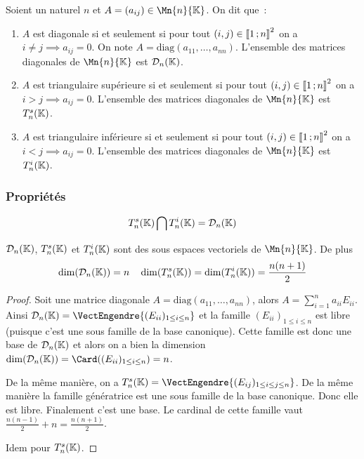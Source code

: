 Soient un naturel $n$ et $A=(a_{ij}) \in \Mn{n}{\K}$. On dit que~:
\begin{enumerate}
\item $A$ est diagonale si et seulement si pour tout $(i,j) \in \mathopen{\llbracket}1\mathclose{}\mathpunct{};n\mathclose{\rrbracket} ^2$ on a $i \neq j \implies a_{ij}=0$. On note $A=\text{diag}(a_{11},\ldots,a_{nn})$. L'ensemble des matrices diagonales de $\Mn{n}{\K}$ est $\mathcal{D}_n(\mathbb{K})$.
\item $A$ est triangulaire supérieure si et seulement si  pour tout $(i,j) \in \mathopen{\llbracket}1\mathclose{}\mathpunct{};n\mathclose{\rrbracket} ^2$ on a $i > j \implies a_{ij}=0$. L'ensemble des matrices diagonales de $\Mn{n}{\K}$ est $T_n^s(\mathbb{K})$.
\item $A$ est triangulaire inférieure si et seulement si  pour tout $(i,j) \in \mathopen{\llbracket}1\mathclose{}\mathpunct{};n\mathclose{\rrbracket} ^2$ on a $i < j \implies a_{ij}=0$. L'ensemble des matrices diagonales de $\Mn{n}{\K}$ est $T_n^i(\mathbb{K})$.
\end{enumerate}

\subsubsection{Propriétés}

\begin{prop}
  \begin{equation}
    T_n^s(\mathbb{K}) \bigcap T_n^i(\mathbb{K}) = \mathcal{D}_n(\mathbb{K})
  \end{equation}
\end{prop}
\begin{prop}
  $\mathcal{D}_n(\mathbb{K})$, $T_n^s(\mathbb{K})$ et $T_n^i(\mathbb{K})$ sont des sous espaces vectoriels de $\Mn{n}{\K}$. De plus
  \begin{equation}
    \dim(\mathcal{D}_n(\mathbb{K})) = n \quad \dim(T_n^s(\mathbb{K}))=\dim(T_n^i(\mathbb{K}))=\frac{n(n+1)}{2}
  \end{equation}
\end{prop}
\begin{proof}
  Soit une matrice diagonale $A=\text{diag}(a_{11},\ldots,a_{nn})$, alors $A=\sum_{i=1}^n a_{ii}E_{ii}$. Ainsi $\Dr_n(\K)=\VectEngendre{(E_{ii})_{1\leq i\leq n}}$ et la famille $(E_{ii})_{1\leq i\leq n}$ est libre (puisque c'est une sous famille de la base canonique). Cette famille est donc une base de $\mathcal{D}_n(\mathbb{K})$ et alors on a bien la dimension $\dim(\Dr_n(\K)) = \Card((E_{ii})_{1\leq i\leq n})=n$.

  De la même manière, on a  $T_n^s(\K) = \VectEngendre{(E_{ij})_{1\leq i \leq j \leq n}}$. De la même manière la famille génératrice est une sous famille de la base canonique. Donc elle est libre. Finalement c'est une base. Le cardinal de cette famille vaut $\frac{n(n-1)}{2}+n=\frac{n(n+1)}{2}$.

  Idem pour $T_n^s(\mathbb{K})$. 
\end{proof}

